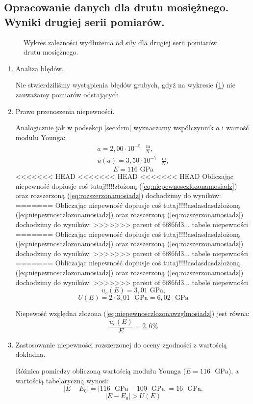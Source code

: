 \documentclass [a4paper,11pt]{article}
\begin{document}
	\subsection{Opracowanie danych dla drutu mosiężnego. Wyniki drugiej serii pomiarów.}
	
	\begin{figure}[!h]
		\centering

		\caption{Wykres zależności wydłużenia od siły dla drugiej serii pomiarów drutu mosiężnego.}
		\label{fig:wykmosiadz2}
	\end{figure}
	
	\begin{enumerate}[label=\alph*)]
		\item Analiza błędów.
		
		Nie stwierdziliśmy wystąpienia błędów grubych, gdyż na wykresie (\ref{fig:wykmosiadz2}) nie zauważamy pomiarów odstających.
		
		\item Prawo przenoszenia niepewności.
		
		Analogicznie jak w podsekcji \ref{sec:drm} wyznaczamy współczynnik $a$ i wartość modułu Younga:
		\begin{align}
		a = 2,00 \cdot 10^{-5} \text{ }\mathrm{\frac{m}{N}},\label{a} \\
		u(a) = 3,50 \cdot 10^{-7} \text{ }\mathrm{\frac{m}{N}},
		\end{align}
		$$ E = 116 \text{ GPa} $$
<<<<<<< HEAD
<<<<<<< HEAD
<<<<<<< HEAD
		Obliczając niepewność dopiusje coś tutaj!!!!!złożoną (\ref{eq:niepewnosczlozonamosiadz}) oraz rozszerzoną (\ref{eq:rozszerzonamosiadz}) dochodzimy do wyników: 
=======
		Obliczając niepewność dopiusje coś tutaj!!!!!asdasdasdzłożoną (\ref{eq:niepewnosczlozonamosiadz}) oraz rozszerzoną (\ref{eq:rozszerzonamosiadz}) dochodzimy do wyników: 
>>>>>>> parent of 6f86fd3... tabele niepewności
=======
		Obliczając niepewność dopiusje coś tutaj!!!!!asdasdasdzłożoną (\ref{eq:niepewnosczlozonamosiadz}) oraz rozszerzoną (\ref{eq:rozszerzonamosiadz}) dochodzimy do wyników: 
>>>>>>> parent of 6f86fd3... tabele niepewności
=======
		Obliczając niepewność dopiusje coś tutaj!!!!!asdasdasdzłożoną (\ref{eq:niepewnosczlozonamosiadz}) oraz rozszerzoną (\ref{eq:rozszerzonamosiadz}) dochodzimy do wyników: 
>>>>>>> parent of 6f86fd3... tabele niepewności
		$$ u_c(E) = 3,01 \text{ GPa,} $$
		$$ U(E) = 2 \cdot 3,01 \text{ }\mathrm{GPa} = 6,02 \text{ }\mathrm{GPa} $$
		
		Niepewość względna złożona (\ref{eq:niepewnosczlozonawzglmosiadz}) jest równa:
		$$ \frac{u_c(E)}{E} = 2,6\% $$
		
		\item Zastosowanie niepewności rozszerzonej do oceny zgodności z wartością dokładną.
		
		Różnica pomiedzy obliczoną wartością modułu Younga ($E=116  \text{ }\mathrm{GPa}$), a wartością tabelaryczną wynosi:
		\begin{equation}
		\label{eq:roznicamosiadz2}
		|E - E_0| = \left|116 \text{ }\mathrm{GPa} - 100 \text{ }\mathrm{GPa}\right| = 16 \text{ }\mathrm{GPa}.
		\end{equation}
		$$
		|E - E_0| > U(E)
		$$
		
		
	\end{enumerate}
\end{document}
